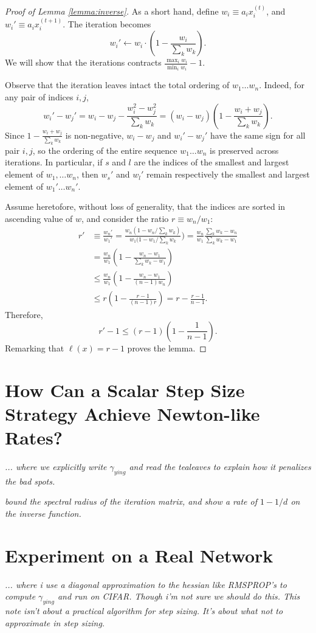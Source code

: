 \documentclass{article}
\begin{document}
\begin{proof}[Proof of Lemma \ref{lemma:inverse}]
As a short hand, define $w_i \equiv a_i x_i^{(t)}$, and $w_i' \equiv a_i x_i^{(t+1)}$. The iteration becomes 
\[
w_i' \leftarrow w_i \cdot \left(1-\frac{w_i}{\sum_k w_k}\right).
\]
We will show that the iterations contracts $\frac{\max_i w_i}{\min_i w_i}-1$.

Observe that the iteration leaves intact the total ordering of $w_1\ldots w_n$. Indeed, for any pair of indices $i,j$,
\[
w_i'-w_j' = w_i-w_j-\frac{w_i^2-w_j^2}{\sum_k w_k} = (w_i-w_j) \left(1-\frac{w_i+w_j}{\sum_k w_k}\right).
\]
Since $1-\frac{w_i+w_j}{\sum_k w_k}$ is non-negative,  $w_i-w_j$ and $w_i'-w_j'$ have the same sign for all pair $i,j$, so the ordering of the entire sequence $w_1\ldots w_n$ is preserved  across iterations. In particular, if $s$ and $l$ are the indices of the smallest and largest element of $w_1,\ldots w_n$, then $w_s'$ and $w_l'$ remain respectively the smallest and largest element of $w_1'\ldots w_n'$. 

Assume heretofore, without loss of generality, that the indices are sorted in ascending value of $w$, and consider  the ratio $r\equiv w_n/w_1$:
\begin{align}
r' &\equiv \frac{w_n'}{w_1'} = \frac{w_n (1-w_n/\sum_k w_k)}{w_1 (1-w_1/\sum_k w_k}) = \frac{w_n}{w_1} \frac{\sum_k w_k - w_n}{\sum_k w_k - w_1} \\
&= \frac{w_n}{w_1} \left(1- \frac{w_n-w_1}{\sum_k w_k - w_1}\right) \\
&\leq \frac{w_n}{w_1}\left(1- \frac{w_n-w_1}{(n-1) w_n}\right) \\
&\leq r \left(1-\frac{r-1}{(n-1)r}\right) = r-\frac{r-1}{n-1}.
\end{align}
Therefore,
\[
 r'-1 \leq (r-1)\left(1-\frac{1}{n-1}\right).
\]
Remarking that $\ell(x) = r-1$ proves the lemma.
\end{proof}

\section{How Can a Scalar Step Size Strategy Achieve Newton-like Rates?}

{\it ... where we explicitly write $\gamma_{ying}$ and read the tealeaves to explain how it penalizes the bad spots.}

{\it bound the spectral radius of the iteration matrix, and show a rate of $1-1/d$ on the inverse function.}


\section{Experiment on a Real Network}

{\it ... where i use a diagonal approximation to the hessian like RMSPROP's to compute $\gamma_{ying}$ and run on CIFAR. Though i'm not sure we should do this. This note isn't about a practical algorithm for step sizing. It's about what not to approximate in step sizing.}
\end{document}
